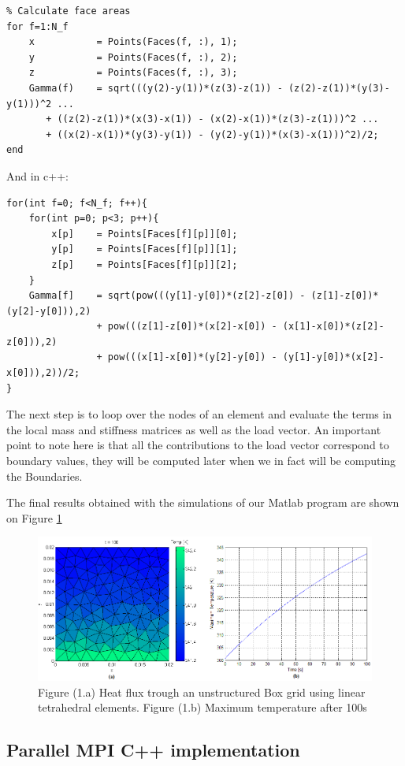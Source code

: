 \documentclass[12pt]{article}
\begin{document}
\begin{lstlisting}
% Calculate face areas
for f=1:N_f	
	x           = Points(Faces(f, :), 1);
	y           = Points(Faces(f, :), 2);
	z           = Points(Faces(f, :), 3);
	Gamma(f)	= sqrt(((y(2)-y(1))*(z(3)-z(1)) - (z(2)-z(1))*(y(3)-y(1)))^2 ... 
	   + ((z(2)-z(1))*(x(3)-x(1)) - (x(2)-x(1))*(z(3)-z(1)))^2 ...
	   + ((x(2)-x(1))*(y(3)-y(1)) - (y(2)-y(1))*(x(3)-x(1)))^2)/2;
end
\end{lstlisting}

And in c++:

\begin{lstlisting}[style=MyC++Style]
for(int f=0; f<N_f; f++){
	for(int p=0; p<3; p++){
		x[p]	= Points[Faces[f][p]][0];
		y[p]	= Points[Faces[f][p]][1];
		z[p]	= Points[Faces[f][p]][2];
	}
	Gamma[f]	= sqrt(pow(((y[1]-y[0])*(z[2]-z[0]) - (z[1]-z[0])*(y[2]-y[0])),2)
				+ pow(((z[1]-z[0])*(x[2]-x[0]) - (x[1]-x[0])*(z[2]-z[0])),2)
				+ pow(((x[1]-x[0])*(y[2]-y[0]) - (y[1]-y[0])*(x[2]-x[0])),2))/2;
}
\end{lstlisting}

The next step is to loop over the nodes of an element and evaluate the terms in the local mass and stiffness matrices as well as the load vector. An important point to note here is that all the contributions to the load vector correspond to boundary values,  they will be computed later when we in fact will be computing the Boundaries. \cite{Steve13}


The final results obtained with the simulations of our Matlab program are shown on Figure \ref{fig:matlab1}

\begin{figure}[h!]
    \includegraphics[scale=0.6]{matlab1}
    \caption{Figure (1.a) Heat flux trough an unstructured Box grid using linear tetrahedral elements. Figure (1.b) Maximum temperature after 100s}
    \label{fig:matlab1}
\end{figure}

\subsection{Parallel MPI C++ implementation}
\end{document}
